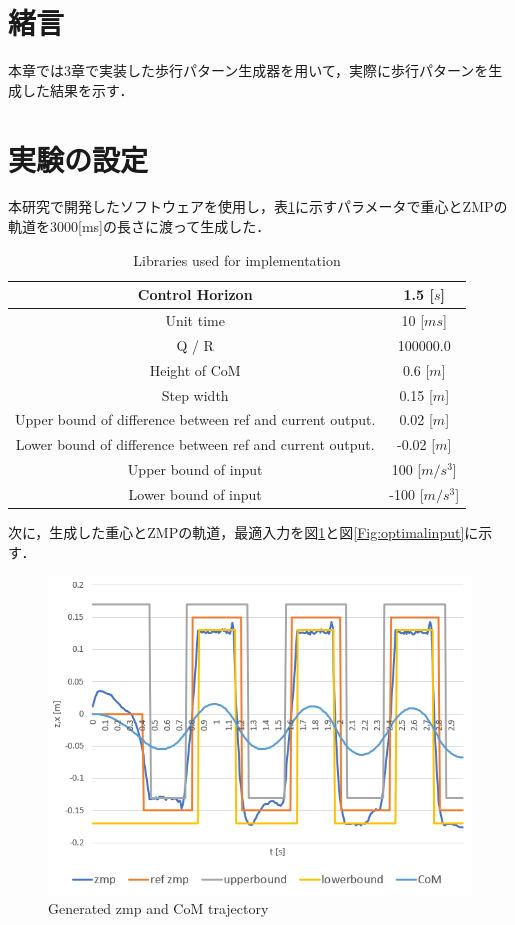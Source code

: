 \section{緒言}
本章では3章で実装した歩行パターン生成器を用いて，実際に歩行パターンを生成した結果を示す．
\section{実験の設定}
本研究で開発したソフトウェアを使用し，表\ref{tb:parametor}に示すパラメータで重心とZMPの軌道を3000[ms]の長さに渡って生成した．

\begin{table}[htbp]
  \centering
  \begin{tabular}{|c|c|} \hline
    Control Horizon & 1.5 [$s$] \\ \hline
    Unit time &10 [$ms$] \\ \hline
    Q / R  & 100000.0 \\ \hline
    Height of CoM & 0.6 [$m$] \\ \hline
    Step width & 0.15 [$m$] \\ \hline
    Upper bound of difference between ref and current output. & 0.02 [$m$] \\ \hline
    Lower bound of difference between ref and current output. & -0.02 [$m$] \\ \hline
    Upper bound of input & 100 [$m/s^{3}$] \\ \hline
    Lower bound of input & -100 [$m/s^{3}$] \\ \hline
  \end{tabular}
  \caption{Libraries used for implementation}
  \label{tb:parametor}
\end{table}

\newpage

次に，生成した重心とZMPの軌道，最適入力を図\ref{Fig:zmptrajectory}と図\ref{Fig:optimalinput}に示す．

\begin{figure}[hbtp]
  \centering
 \includegraphics[keepaspectratio, scale=0.6]
      {images/zmp_trajectory.png}
 \caption{Generated zmp and CoM trajectory }
 \label{Fig:zmptrajectory}
\end{figure}

